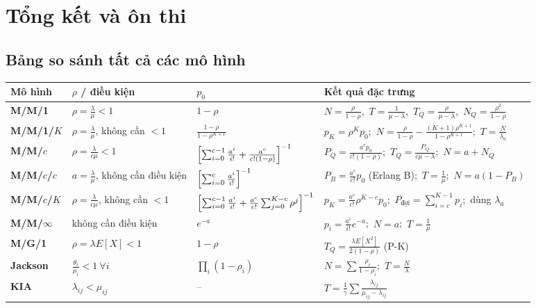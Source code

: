 \section{Tổng kết và ôn thi}

\subsection{Bảng so sánh tất cả các mô hình}

\begingroup
\small
\everymath{\displaystyle}
\renewcommand{\arraystretch}{2.6}
\begin{tabularx}{\linewidth}{@{}>{\bfseries}l >{\raggedright\arraybackslash}p{2.3cm} >{\raggedright\arraybackslash}X >{\raggedright\arraybackslash}X@{}}
\toprule
\normalfont\textbf{Mô hình} & \textbf{$\rho$ / điều kiện} & \textbf{$p_0$} & \textbf{Kết quả đặc trưng} \\
\midrule
M/M/1 & $\rho = \frac{\lambda}{\mu}<1$ & $1-\rho$ & $N = \frac{\rho}{1-\rho}$,\ $T = \frac{1}{\mu-\lambda}$,\ $T_Q = \frac{\rho}{\mu-\lambda}$,\ $N_Q = \frac{\rho^2}{1-\rho}$ \\
M/M/1/$K$ & $\rho=\frac{\lambda}{\mu}$, không cần $<1$ & $\frac{1-\rho}{1-\rho^{K+1}}$ & $p_K = \rho^K p_0$;\ $N = \frac{\rho}{1-\rho}-\frac{(K+1)\rho^{K+1}}{1-\rho^{K+1}}$;\ $T = \frac{N}{\lambda_a}$ \\
M/M/$c$ & $\rho = \frac{\lambda}{c\mu}<1$ & $\Bigl[\sum_{i=0}^{c-1}\frac{a^i}{i!}+\frac{a^c}{c!(1-\rho)}\Bigr]^{-1}$ & $P_Q = \frac{a^c p_0}{c!(1-\rho)}$;\ $T_Q = \frac{P_Q}{c\mu-\lambda}$;\ $N = a + N_Q$ \\
M/M/$c$/$c$ & $a = \frac{\lambda}{\mu}$, không cần điều kiện & $\Bigl[\sum_{i=0}^{c}\frac{a^i}{i!}\Bigr]^{-1}$ & $P_B = \frac{a^c}{c!}p_0$ (Erlang B);\ $T = \frac1\mu$;\ $N = a(1-P_B)$ \\
M/M/$c$/$K$ & $\rho = \frac{\lambda}{c\mu}$, không cần $<1$ & $\Bigl[\sum_{i=0}^{c-1}\frac{a^i}{i!}+\frac{a^c}{c!}\sum_{j=0}^{K-c}\rho^j\Bigr]^{-1}$ & $p_K = \frac{a^c}{c!}\rho^{K-c}p_0$;\ $P_{\text{đợi}}=\sum_{i=c}^{K-1}p_i$;\ dùng $\lambda_a$ \\
M/M/$\infty$ & không cần điều kiện & $e^{-a}$ & $p_i = \frac{a^i}{i!}e^{-a}$;\ $N = a$;\ $T = \frac1\mu$ \\
M/G/1 & $\rho = \lambda E[X]<1$ & $1-\rho$ & $T_Q = \frac{\lambda E[X^2]}{2(1-\rho)}$ (P-K) \\
Jackson & $\frac{\theta_i}{\mu_i}<1\ \forall i$ & $\prod_i(1-\rho_i)$ & $N = \sum\frac{\rho_i}{1-\rho_i}$;\ $T = \frac{N}{\lambda}$ \\
KIA & $\lambda_{ij}<\mu_{ij}$ & -- & $T = \frac1\gamma\sum\frac{\lambda_{ij}}{\mu_{ij}-\lambda_{ij}}$ \\
\bottomrule
\end{tabularx}
\endgroup

